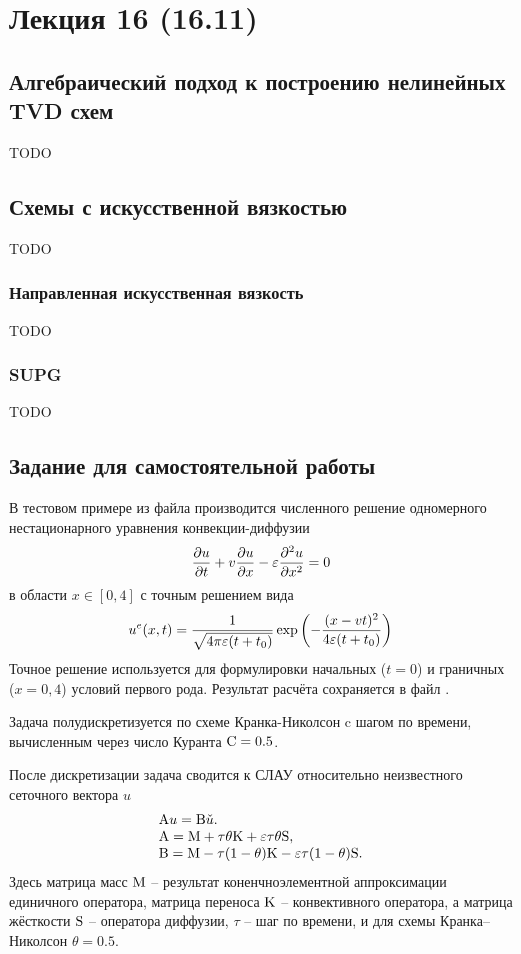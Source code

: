 \section{Лекция 16 (16.11)}

\subsection{Алгебраический подход к построению нелинейных TVD схем}
TODO

\subsection{Схемы с искусственной вязкостью}
TODO
\subsubsection{Направленная искусственная вязкость}
TODO
\subsubsection{SUPG}
TODO


\subsection{Задание для самостоятельной работы}
\label{sec:hw_supg}
В тестовом примере  из файла 
производится численного решение одномерного нестационарного уравнения конвекции-диффузии
$$
\frac{\partial u}{\partial t} + v \frac{\partial u}{\partial x} - \varepsilon \frac{\partial^2 u}{\partial x^2} = 0
$$
в области $x\in[0, 4]$
с точным решением вида
$$
u^e(x, t) = \frac{1}{\sqrt{4\pi \varepsilon (t + t_0)}} \exp\left(-\frac{(x - v t)^2}{4\varepsilon(t+t_0)}\right)
$$
Точное решение используется для формулировки начальных ($t=0$) и граничных ($x=0,4$) условий первого рода.
Результат расчёта сохраняется в файл .

Задача полудискретизуется по схеме Кранка-Николсон c шагом по времени, вычисленным через число Куранта $\rm C = 0.5$.

После дискретизации задача сводится к СЛАУ относительно неизвестного сеточного вектора $u$
$$
\begin{array}{ll}
{\rm A} u = {\rm B} \check u. \\
{\rm A} = {\rm M} + \tau\theta {\rm K} + \varepsilon\tau\theta {\rm S}, \\
{\rm B} = {\rm M} - \tau(1-\theta){\rm K} - \varepsilon\tau(1-\theta) {\rm S}.
\end{array}
$$
Здесь матрица масс ${\rm M}$ -- результат коненчноэлементной аппроксимации единичного оператора,
матрица переноса ${\rm K}$ -- конвективного оператора,
а матрица жёсткости ${\rm S}$ -- оператора диффузии,
$\tau$ -- шаг по времени, и для схемы Кранка--Николсон $\theta=0.5$.


